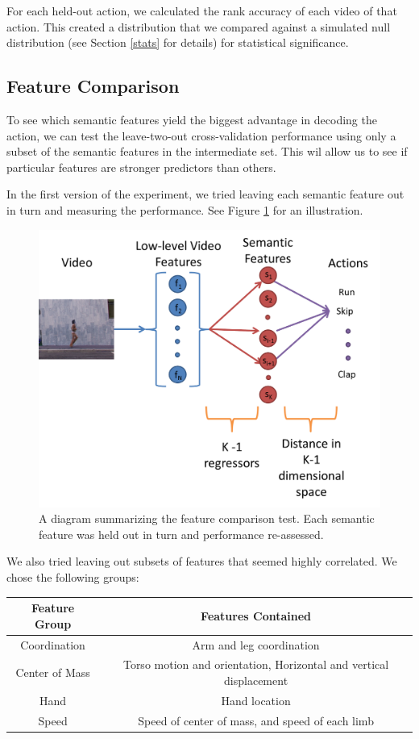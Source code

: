 \documentclass{article}
\begin{document}
For each held-out action, we calculated the rank accuracy of each video of that action. This created a distribution that we compared against a simulated null distribution (see Section \ref{stats} for details) for statistical significance.

\subsection{Feature Comparison}
To see which semantic features yield the biggest advantage in decoding the action, we can test the leave-two-out cross-validation performance using only a subset of the semantic features in the intermediate set. This wil allow us to see if particular features are stronger predictors than others.

In the first version of the experiment, we tried leaving each semantic feature out in turn and measuring the performance. See Figure \ref{feature} for an illustration.

\begin{figure}[h]
  \centering
  \includegraphics[width = .4\linewidth]{features}
  \caption{A diagram summarizing the feature comparison test. Each semantic feature was held out in turn and performance re-assessed.}
  \label{feature}
\end{figure}

We also tried leaving out subsets of features that seemed highly correlated. We chose the following groups:

\begin{table}[h]
\centering
\begin{tabular}{c|c}
Feature Group & Features Contained\\ \hline
Coordination & Arm and leg coordination \\ \hline
Center of Mass & Torso motion and orientation, Horizontal and vertical displacement\\ \hline
Hand & Hand location \\ \hline
Speed & Speed of center of mass, and speed of each limb \\
\end{tabular}
\end{table}
\end{document}
